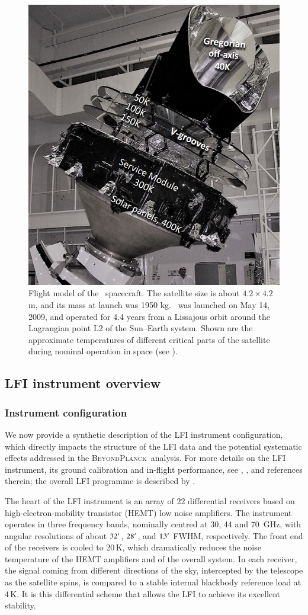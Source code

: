 \documentclass[onecolumn]{aa}
\newcommand{\BP}{\textsc{BeyondPlanck}}
\begin{document}
\begin{figure}[t]
	\center
	\includegraphics[width=0.5\linewidth]{figs/PLANCK-PICTURE.png}
	\caption{Flight model of the \Planck\ spacecraft. The satellite size is about $4.2 \times 4.2$\,m, and its mass at launch was 1950 kg. \Planck\ was launched on May 14, 2009, and operated for 4.4 years from a Lissajous orbit around the Lagrangian point L2 of the Sun--Earth system. Shown are the approximate temperatures of different critical parts of the satellite during nominal operation in space (see \citealp{planck2011-1.3}).}
	\label{fig:PLANCK-PICTURE}
\end{figure}

\subsection{LFI instrument overview}
\subsubsection{Instrument configuration}

We now provide a synthetic description of the LFI instrument
configuration, which directly impacts the structure of the LFI data
and the potential systematic effects addressed in the \BP\ 
analysis. For more details on the LFI instrument, its ground
calibration and in-flight performance, see
\cite{bersanelli2010}, \citet{planck2011-1.4}, and references therein; the
overall LFI programme is described by \citet{mandolesi2010}.

The heart of the LFI instrument is an array of 22 differential
receivers based on high-electron-mobility transistor (HEMT) low noise
amplifiers. The instrument operates in three frequency bands,
nominally centred at 30, 44 and 70~GHz, with angular resolutions of
about $32\arcm$, $28\arcm$, and $13\arcm$ FWHM, respectively.  The front end of the
receivers is cooled to 20\,K, which dramatically reduces the noise
temperature of the HEMT amplifiers and of the overall system.  In each
receiver, the signal coming from different directions of the sky,
intercepted by the telescope as the satellite spins, is compared to a
stable internal blackbody reference load at 4\,K. It is this
differential scheme that allows the LFI to achieve its excellent
stability.
\end{document}
